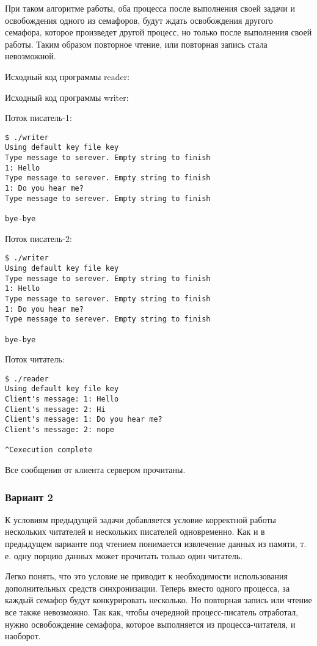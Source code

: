 \documentclass[a4paper]{article}
\begin{document}
	При таком алгоритме работы, оба процесса после выполнения своей задачи и освобождения одного из семафоров, будут ждать освобождения другого семафора, которое произведет другой процесс, но только после выполнения своей работы. Таким образом повторное чтение, или повторная запись стала невозможной.
	
	Исходный код программы reader:
	
		
	Исходный код программы writer:
	
	
	Поток писатель-1:
	\begin{lstlisting}[style=crs_bash]
$ ./writer 
Using default key file key
Type message to serever. Empty string to finish
1: Hello 
Type message to serever. Empty string to finish
1: Do you hear me?
Type message to serever. Empty string to finish

bye-bye
	\end{lstlisting}
	
	Поток писатель-2:
	\begin{lstlisting}[style=crs_bash]
$ ./writer 
Using default key file key
Type message to serever. Empty string to finish
1: Hello 
Type message to serever. Empty string to finish
1: Do you hear me?
Type message to serever. Empty string to finish

bye-bye
	\end{lstlisting}
	
	Поток читатель:
	\begin{lstlisting}[style=crs_bash]
$ ./reader 
Using default key file key
Client's message: 1: Hello
Client's message: 2: Hi
Client's message: 1: Do you hear me?
Client's message: 2: nope

^Cexecution complete
	\end{lstlisting}
	
	Все сообщения от клиента сервером прочитаны.
	
	\subsubsection{Вариант 2}
	К условиям предыдущей задачи добавляется условие корректной работы нескольких читателей и нескольких писателей одновременно. Как и в предыдущем варианте под чтением понимается извлечение данных из памяти, т. е. одну порцию данных может прочитать только один читатель.

	Легко понять, что это условие не приводит к необходимости использования дополнительных средств синхронизации. Теперь вместо одного процесса, за каждый семафор будут конкурировать несколько. Но повторная запись или чтение все также невозможно. Так как, чтобы очередной процесс-писатель отработал, нужно освобождение семафора, которое выполняется из процесса-читателя, и наоборот.
	
\end{document}
